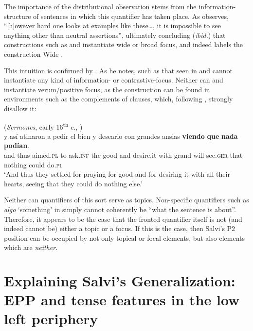 \documentclass[output=paper]{LSP/langsci}
\begin{document}
The importance of the distributional observation stems from the information-struc\-ture of sentences in which this quantifier  has taken place.  As \citet[390]{Mackenzie2010} observes, “[h]owever hard one looks at examples like these…, it is impossible to see anything other than neutral assertions”, ultimately concluding (\textit{ibid.}) that constructions such as  and  instantiate wide or broad focus, and indeed labels the construction Wide  .

This intuition is confirmed by \citet{Poole2016}.  As he notes,  such as that seen in  and  cannot instantiate any kind of information- or contrastive-focus.  Neither can  and  instantiate verum/positive  focus, as the construction can be found in environments such as the complements of  clauses, which, following \citet{LeonettiEscandell-Vidal2009}, strongly disallow it:

\noindent\parbox{\textwidth}{\ea%
    \label{ex:poole:16}
(\textit{Sermones}, early 16\textsuperscript{th} c., \citealt[(4)]{Poole2013})\\    
    \gll    y     así   atinaron   a  pedir     el bien   y desearlo con grandes ansias   \textbf{viendo} \textbf{que} \textbf{nada} \textbf{podían}.\\
	  and thus aimed.\textsc{pl} to ask.\textsc{inf} the good and desire.it with grand will   see.\textsc{ger} that nothing {could do.\textsc{pl}}\\
    \glt ‘And thus they settled for praying for good and for desiring it with all their hearts, seeing that they could do nothing else.’
    \z}

\noindent Neither can quantifiers of this sort serve as topics.  Non-specific quantifiers such as \textit{algo} ‘something’ in  simply cannot coherently be ``what the sentence is about''.  Therefore, it appears to be the case that the fronted quantifier itself is not (and indeed cannot be) either a topic or a focus.  If this is the case, then Salvi’s P2 position can be occupied by not only topical or focal elements, but also elements which are \textit{neither}. 

\section{Explaining Salvi’s Generalization:  EPP and tense features in the low left periphery}\label{sec:poole:3}
\end{document}
